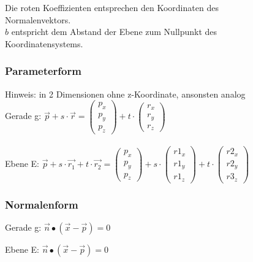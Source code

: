 		    Die roten Koeffizienten entsprechen den Koordinaten des \\
		    Normalenvektors. \\
		    $b$ entspricht dem Abstand der Ebene zum Nullpunkt des \\
		    Koordinatensystems.
	    
	    
	
		    
		    
			\subsubsection{Parameterform}
			Hinweis: in 2 Dimensionen ohne z-Koordinate, ansonsten analog \\			
			
			Gerade g: \quad $\vec{p} + s \cdot \vec{r} = \begin{pmatrix} p_x \\ p_y \\ p_z \end{pmatrix}	+ t \cdot \begin{pmatrix} r_x \\ r_y \\ r_z \end{pmatrix}$ \\
			\\

			Ebene E: \quad $\vec{p} + s \cdot \vec{r_1} + t \cdot \vec{r_2} = \begin{pmatrix} p_x \\ p_y \\ p_z \end{pmatrix}	+ s \cdot \begin{pmatrix} r1_x \\ r1_y \\ r1_z \end{pmatrix} + t \cdot \begin{pmatrix} r2_x \\ r2_y \\ r3_z \end{pmatrix}$ 
			
			
			\subsubsection{Normalenform}		   
			\begin{minipage}{0.48\linewidth}
			Gerade g: \quad $\vec{n} \bullet (\vec{x} - \vec{p}) = 0$ \\
			\end{minipage}	
			\hfill	
			\begin{minipage}{0.48\linewidth}
			Ebene E: \quad $\vec{n} \bullet (\vec{x} - \vec{p}) = 0$ \\
			\end{minipage}	 
		    
